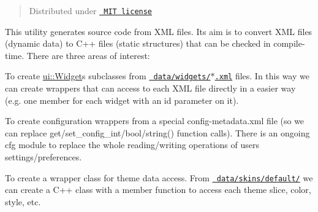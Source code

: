 \begin{quote}
Distributed under \href{LICENSE.txt}{\texttt{ MIT license}} \end{quote}
This utility generates source code from XML files. Its aim is to convert XML files (dynamic data) to C++ files (static structures) that can be checked in compile-\/time. There are three areas of interest\+:


\begin{DoxyEnumerate}
\item To create {\ttfamily \mbox{\hyperlink{classui_1_1_widget}{ui\+::\+Widget}}}s subclasses from \href{../../data/widgets/}{\texttt{ data/widgets/$\ast$.xml}} files. In this way we can create wrappers that can access to each XML file directly in a easier way (e.\+g. one member for each widget with an {\ttfamily id} parameter on it).
\item To create configuration wrappers from a special {\ttfamily config-\/metadata.\+xml} file (so we can replace {\ttfamily get/set\+\_\+config\+\_\+int/bool/string()} function calls). There is an ongoing {\ttfamily cfg} module to replace the whole reading/writing operations of user\textquotesingle{}s settings/preferences.
\item To create a wrapper class for theme data access. From \href{../../data/skins/default/}{\texttt{ data/skins/default/}} we can create a C++ class with a member function to access each theme slice, color, style, etc. 
\end{DoxyEnumerate}